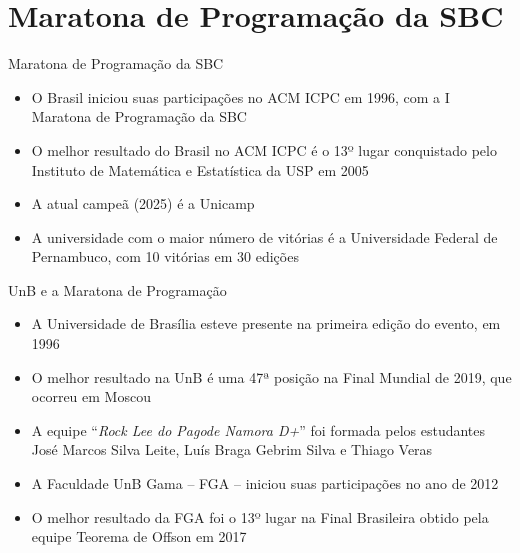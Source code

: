 \section{Maratona de Programação da SBC}

\begin{frame}[fragile]{Maratona de Programação da SBC}

    \begin{itemize}
        \item O Brasil iniciou suas participações no ACM ICPC em 1996, com a I Maratona de
            Programação da SBC
        \item O melhor resultado do Brasil no ACM ICPC é o 13º lugar conquistado pelo 
            Instituto de Matemática e Estatística da USP em 2005
        \item A atual campeã (2025) é a Unicamp
        \item A universidade com o maior número de vitórias é a Universidade Federal de
            Pernambuco, com 10 vitórias em 30 edições
    \end{itemize}

\end{frame}

\begin{frame}[fragile]{UnB e a Maratona de Programação}

    \begin{itemize}
        \item A Universidade de Brasília esteve presente na primeira edição do evento, em 1996
        \item O melhor resultado na UnB é uma 47ª posição na Final Mundial de 2019, que ocorreu
            em Moscou

        \item A equipe ``\textit{Rock Lee do Pagode Namora D+}'' foi formada pelos estudantes José Marcos 
            Silva Leite, Luís Braga Gebrim Silva e Thiago Veras

        \item A Faculdade UnB Gama -- FGA -- iniciou suas participações no ano de 2012
        \item O melhor resultado da FGA foi o 13º lugar na Final Brasileira obtido pela equipe 
            Teorema de Offson em 2017
    \end{itemize}

\end{frame}
